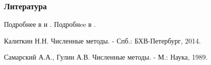 \documentclass[10pt]{beamer}
\begin{document}
\begin{frame}[fragile]
\frametitle{Литература}
Подробнее в \cite[стр. 86]{Kalitkin} и \cite[стр. 72]{Samarsky}.
Подробнee в \cite[стр. 117]{Kalitkin}.

\begin{thebibliography}{99}

Калиткин Н.Н. Численные методы. - Спб.: БХВ-Петербург, 2014.

Самарский А.А., Гулин А.В. Численные методы. - М.: Наука, 1989.

\end{thebibliography}
\end{frame}
\end{document}
